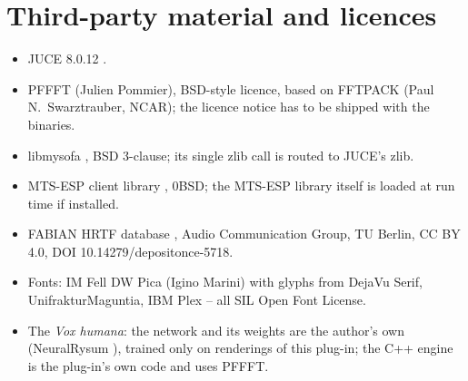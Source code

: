 \documentclass[11pt,a4paper,parskip=half,DIV=11,toc=bibliography]{scrartcl}
\newcommand{\ui}[1]{\emph{#1}}                 %
\begin{document}
\section{Third-party material and licences}
\begin{itemize}
  \item JUCE 8.0.12 \citep{juce}.
  \item PFFFT \citep{pffft} (Julien Pommier), BSD-style licence, based on FFTPACK (Paul N.\ Swarztrauber,
        NCAR); the licence notice has to be shipped with the binaries.
  \item libmysofa \citep{libmysofa}, BSD 3-clause; its single zlib call is routed to JUCE's zlib.
  \item MTS-ESP client library \citep{mtsesp}, 0BSD; the MTS-ESP library itself is loaded at run time if
        installed.
  \item FABIAN HRTF database \citep{brinkmann2017fabian}, Audio Communication Group, TU Berlin,
        CC BY 4.0, DOI 10.14279/depositonce-5718.
  \item Fonts: IM Fell DW Pica (Igino Marini) with glyphs from DejaVu Serif, UnifrakturMaguntia, IBM Plex --
        all SIL Open Font License.
  \item The \ui{Vox humana}: the network and its weights are the author's own (NeuralRysum \citep{neuralrysum2}), trained only on renderings
        of this plug-in; the C++ engine is the plug-in's own code and uses PFFFT.
\end{itemize}
\end{document}
